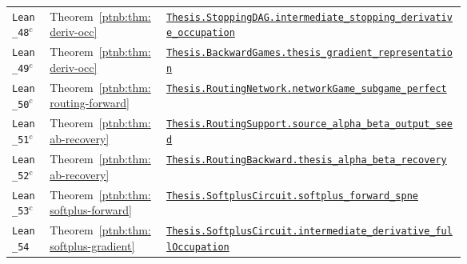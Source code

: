 {\begin{longtable}{@{}l l >{\raggedright\arraybackslash}p{0.66\linewidth}@{}}
\texttt{Lean\_48}$^{\mathrm c}$ & Theorem~\ref{ptnb:thm:deriv-occ} & \href{https://github.com/JayPiZimmermann/A-Structural-Approach-to-Explainable-Deep-Learning/blob/b1c18a7ed02eadd720b0b693794ba7e7dd2628f6/formalization/Thesis/StoppingDAGIntermediate.lean\#L90}{\texttt{Thesis.\allowbreak StoppingDAG.\allowbreak intermediate\_stopping\_derivative\_occupation}} \\
\texttt{Lean\_49}$^{\mathrm c}$ & Theorem~\ref{ptnb:thm:deriv-occ} & \href{https://github.com/JayPiZimmermann/A-Structural-Approach-to-Explainable-Deep-Learning/blob/b1c18a7ed02eadd720b0b693794ba7e7dd2628f6/formalization/Thesis/BackwardGames.lean\#L252}{\texttt{Thesis.\allowbreak BackwardGames.\allowbreak thesis\_gradient\_representation}} \\
\texttt{Lean\_50}$^{\mathrm c}$ & Theorem~\ref{ptnb:thm:routing-forward} & \href{https://github.com/JayPiZimmermann/A-Structural-Approach-to-Explainable-Deep-Learning/blob/b1c18a7ed02eadd720b0b693794ba7e7dd2628f6/formalization/Thesis/RoutingNetwork.lean\#L205}{\texttt{Thesis.\allowbreak RoutingNetwork.\allowbreak networkGame\_subgame\_perfect}} \\
\texttt{Lean\_51}$^{\mathrm c}$ & Theorem~\ref{ptnb:thm:ab-recovery} & \href{https://github.com/JayPiZimmermann/A-Structural-Approach-to-Explainable-Deep-Learning/blob/b1c18a7ed02eadd720b0b693794ba7e7dd2628f6/formalization/Thesis/RoutingSupport.lean\#L73}{\texttt{Thesis.\allowbreak RoutingSupport.\allowbreak source\_alpha\_beta\_output\_seed}} \\
\texttt{Lean\_52}$^{\mathrm c}$ & Theorem~\ref{ptnb:thm:ab-recovery} & \href{https://github.com/JayPiZimmermann/A-Structural-Approach-to-Explainable-Deep-Learning/blob/b1c18a7ed02eadd720b0b693794ba7e7dd2628f6/formalization/Thesis/RoutingBackward.lean\#L122}{\texttt{Thesis.\allowbreak RoutingBackward.\allowbreak thesis\_alpha\_beta\_recovery}} \\
\texttt{Lean\_53}$^{\mathrm c}$ & Theorem~\ref{ptnb:thm:softplus-forward} & \href{https://github.com/JayPiZimmermann/A-Structural-Approach-to-Explainable-Deep-Learning/blob/b1c18a7ed02eadd720b0b693794ba7e7dd2628f6/formalization/Thesis/SoftplusCircuitUniqueness.lean\#L57}{\texttt{Thesis.\allowbreak SoftplusCircuit.\allowbreak softplus\_forward\_spne}} \\
\texttt{Lean\_54} & Theorem~\ref{ptnb:thm:softplus-gradient} & \href{https://github.com/JayPiZimmermann/A-Structural-Approach-to-Explainable-Deep-Learning/blob/b1c18a7ed02eadd720b0b693794ba7e7dd2628f6/formalization/Thesis/SoftplusCircuitVisits.lean\#L162}{\texttt{Thesis.\allowbreak SoftplusCircuit.\allowbreak intermediate\_derivative\_fullOccupation}} \\

\end{longtable}}
